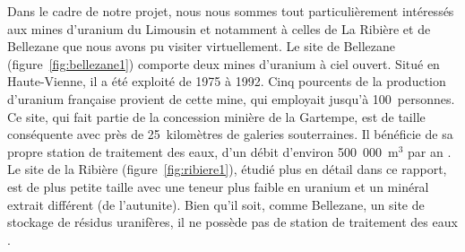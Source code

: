 \documentclass{article}
\begin{document}
Dans le cadre de notre projet, nous nous sommes tout particulièrement intéressés aux mines d'uranium du Limousin et notamment à celles de La Ribière et de Bellezane que nous avons pu visiter virtuellement. Le site de Bellezane (figure~\ref{fig:bellezane1}) comporte deux mines d'uranium à ciel ouvert. Situé en Haute-Vienne, il a été exploité de 1975 à 1992. Cinq pourcents de la production d’uranium française provient de cette mine, qui employait jusqu’à 100~personnes. Ce site, qui fait partie de la concession minière de la Gartempe, est de taille conséquente avec près de 25~kilomètres de galeries souterraines. Il bénéficie de sa propre station de traitement des eaux, d'un débit d'environ 500~000~$\text{m}^3$ par an \cite{benesteau_site_2020}. Le site de la Ribière (figure~\ref{fig:ribiere1}), étudié plus en détail dans ce rapport, est de plus petite taille avec une teneur plus faible en uranium et un minéral extrait différent (de l’autunite). Bien qu'il soit, comme Bellezane, un site de stockage de résidus uranifères, il ne possède pas de station de traitement des eaux \cite{descostes_introduction_2020}.

\end{document}
